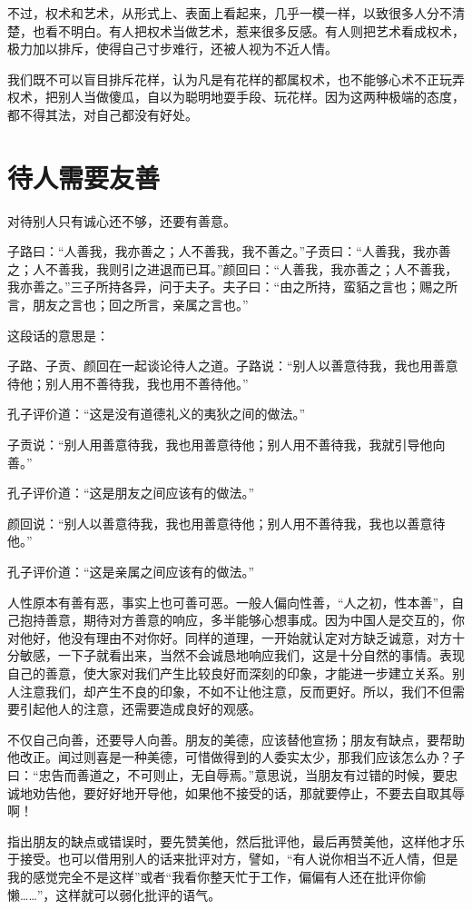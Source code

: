 \documentclass[fontset=fandol, a4paper, 12pt, openright]{ctexbook}
\begin{document}
不过，权术和艺术，从形式上、表面上看起来，几乎一模一样，以致很多人分不清楚，也看不明白。有人把权术当做艺术，惹来很多反感。有人则把艺术看成权术，极力加以排斥，使得自己寸步难行，还被人视为不近人情。

我们既不可以盲目排斥花样，认为凡是有花样的都属权术，也不能够心术不正玩弄权术，把别人当做傻瓜，自以为聪明地耍手段、玩花样。因为这两种极端的态度，都不得其法，对自己都没有好处。

\section{待人需要友善}

对待别人只有诚心还不够，还要有善意。

子路曰：“人善我，我亦善之；人不善我，我不善之。”子贡曰：“人善我，我亦善之；人不善我，我则引之进退而已耳。”颜回曰：“人善我，我亦善之；人不善我，我亦善之。”三子所持各异，问于夫子。夫子曰：“由之所持，蛮貊之言也；赐之所言，朋友之言也；回之所言，亲属之言也。”

这段话的意思是：

子路、子贡、颜回在一起谈论待人之道。子路说：“别人以善意待我，我也用善意待他；别人用不善待我，我也用不善待他。”

孔子评价道：“这是没有道德礼义的夷狄之间的做法。”

子贡说：“别人用善意待我，我也用善意待他；别人用不善待我，我就引导他向善。”

孔子评价道：“这是朋友之间应该有的做法。”

颜回说：“别人以善意待我，我也用善意待他；别人用不善待我，我也以善意待他。”

孔子评价道：“这是亲属之间应该有的做法。”

人性原本有善有恶，事实上也可善可恶。一般人偏向性善，“人之初，性本善”，自己抱持善意，期待对方善意的响应，多半能够心想事成。因为中国人是交互的，你对他好，他没有理由不对你好。同样的道理，一开始就认定对方缺乏诚意，对方十分敏感，一下子就看出来，当然不会诚恳地响应我们，这是十分自然的事情。表现自己的善意，使大家对我们产生比较良好而深刻的印象，才能进一步建立关系。别人注意我们，却产生不良的印象，不如不让他注意，反而更好。所以，我们不但需要引起他人的注意，还需要造成良好的观感。

不仅自己向善，还要导人向善。朋友的美德，应该替他宣扬；朋友有缺点，要帮助他改正。闻过则喜是一种美德，可惜做得到的人委实太少，那我们应该怎么办？子曰：“忠告而善道之，不可则止，无自辱焉。”意思说，当朋友有过错的时候，要忠诚地劝告他，要好好地开导他，如果他不接受的话，那就要停止，不要去自取其辱啊！

指出朋友的缺点或错误时，要先赞美他，然后批评他，最后再赞美他，这样他才乐于接受。也可以借用别人的话来批评对方，譬如，“有人说你相当不近人情，但是我的感觉完全不是这样”或者“我看你整天忙于工作，偏偏有人还在批评你偷懒……”，这样就可以弱化批评的语气。
\end{document}
